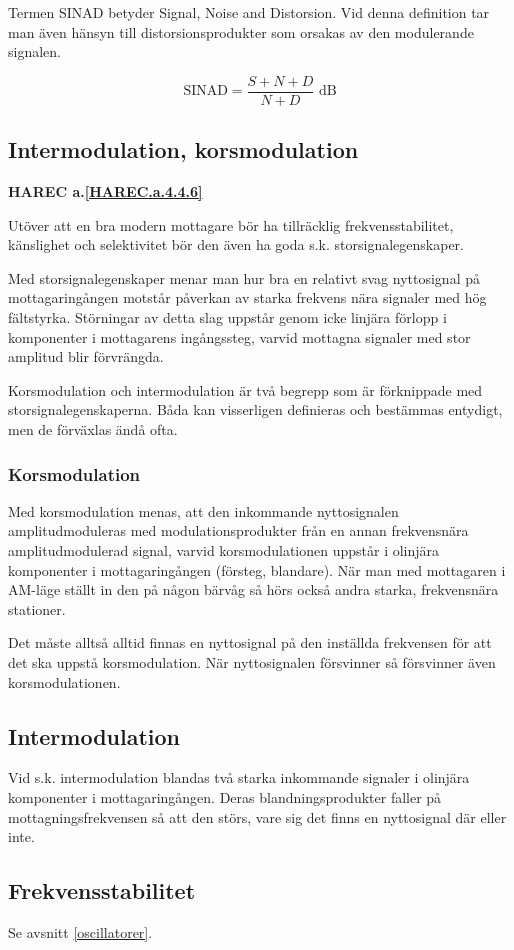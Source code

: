 Termen SINAD betyder Signal, Noise and Distorsion. Vid denna
definition tar man även hänsyn till distorsionsprodukter som orsakas
av den modulerande signalen. 

\[
\text{SINAD} = \frac{S+N+D}{N+D}\text{ dB}
\]

\subsection{Intermodulation, korsmodulation}
\textbf{HAREC a.\ref{HAREC.a.4.4.6}\label{myHAREC.a.4.4.6}}

Utöver att en bra modern mottagare bör ha tillräcklig
frekvensstabilitet, känslighet och selektivitet bör den även ha goda
s.k. storsignalegenskaper.

Med storsignalegenskaper menar man hur bra en relativt svag
nyttosignal på mottagaringången motstår påverkan av starka
frekvens nära signaler med hög fältstyrka.  Störningar av detta slag
uppstår genom icke linjära förlopp i komponenter i mottagarens
ingångssteg, varvid mottagna signaler med stor amplitud blir
förvrängda.

Korsmodulation och intermodulation är två begrepp som är förknippade
med storsignalegenskaperna. Båda kan visserligen definieras och
bestämmas entydigt, men de förväxlas ändå ofta.

\subsubsection{Korsmodulation}

Med korsmodulation menas, att den inkommande nyttosignalen
amplitudmoduleras med modulationsprodukter från en annan frekvensnära
amplitudmodulerad signal, varvid korsmodulationen uppstår i olinjära
komponenter i mottagaringången (försteg, blandare). När man med
mottagaren i AM-läge ställt in den på någon bärvåg så hörs också andra
starka, frekvensnära stationer.

Det måste alltså alltid finnas en nyttosignal på den inställda
frekvensen för att det ska uppstå korsmodulation. När nyttosignalen
försvinner så försvinner även korsmodulationen.

\subsection{Intermodulation}

Vid s.k. intermodulation blandas två starka inkommande signaler i
olinjära komponenter i mottagaringången. Deras blandningsprodukter
faller på mottagningsfrekvensen så att den störs, vare sig det finns
en nyttosignal där eller inte.

\subsection{Frekvensstabilitet}

Se avsnitt \ref{oscillatorer}.

